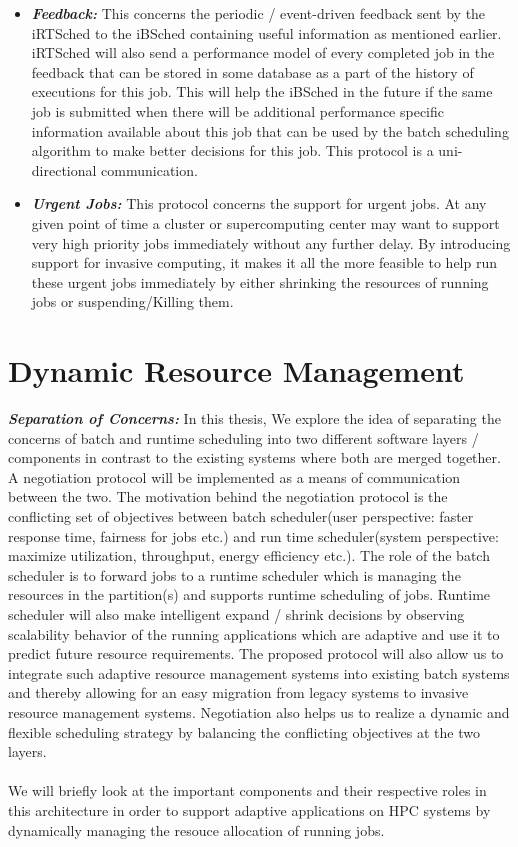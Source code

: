 \begin{itemize}
\item \textbf{\textit{Feedback:}} This concerns the periodic / event-driven feedback sent by the iRTSched to the iBSched containing useful information as mentioned earlier. iRTSched will also send a performance model of every completed job in the feedback that can be stored in some database as a part of the history of executions for this job. This will help the iBSched in the future if the same job is submitted when there will be additional performance specific information available about this job that can be used by the batch scheduling algorithm to make better decisions for this job. This protocol is a uni-directional communication.
\item \textbf{\textit{Urgent Jobs:}} This protocol concerns the support for urgent jobs. At any given point of time a cluster or supercomputing center may want to support very high priority jobs immediately without any further delay. By introducing support for invasive computing, it makes it all the more feasible to help run these urgent jobs immediately by either shrinking the resources of running jobs or suspending/Killing them.
\end{itemize}
\section{Dynamic Resource Management}
\textbf{\textit{Separation of Concerns: }}In this thesis, We explore the idea of separating the concerns of batch and runtime scheduling into
two different software layers / components in contrast to the existing systems where both are merged together. A negotiation protocol will be implemented as a means of communication between the two. The motivation behind the negotiation protocol is the conflicting set of objectives between batch scheduler(user perspective: faster response time, fairness for jobs etc.) and run time scheduler(system perspective: maximize utilization, throughput, energy efficiency etc.). The role of the batch scheduler is to forward jobs to a runtime scheduler which is managing the resources in the partition(s) and supports runtime scheduling of jobs. Runtime scheduler will also make intelligent expand / shrink decisions by observing scalability behavior of the running applications which are adaptive and use it to predict future resource requirements. The proposed protocol will also allow us to integrate such adaptive resource management systems into existing batch systems and thereby allowing for an easy migration from legacy systems to invasive resource management systems. Negotiation also helps us to realize a dynamic and flexible scheduling strategy by balancing the conflicting objectives at the two layers.\\ \\
We will briefly look at the important components and their respective roles in this architecture in order to support adaptive applications on HPC systems by dynamically managing the resouce allocation of running jobs. 
